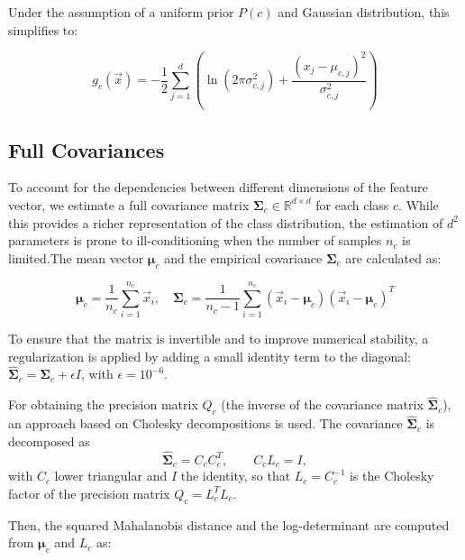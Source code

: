 Under the assumption of a uniform prior $P(c)$ and Gaussian distribution, this simplifies to:

\begin{equation}
	g_c(\vec{x}) = -\frac{1}{2} \sum_{j=1}^{d} \left( \ln(2\pi\sigma_{c,j}^2) + \frac{(x_j - \mu_{c,j})^2}{\sigma_{c,j}^2} \right)
\end{equation}


\subsection{Full Covariances}
\label{sec:method:full_cov}

To account for the dependencies between different dimensions of the feature vector, we estimate a full covariance matrix $\boldsymbol{\Sigma}_c \in \mathbb{R}^{d \times d}$ for each class $c$. While this provides a richer representation of the class distribution, the estimation of $d^2$ parameters is prone to ill-conditioning when the number of samples $n_c$ is limited.The mean vector $\boldsymbol{\mu}_c$ and the empirical covariance $\boldsymbol{\Sigma}_c$ are calculated as:

\begin{equation}
	\boldsymbol{\mu}_c = \frac{1}{n_c} \sum_{i=1}^{n_c} \vec{x}_i, \quad \boldsymbol{\Sigma}_c = \frac{1}{n_c - 1} \sum_{i=1}^{n_c} (\vec{x}_i - \boldsymbol{\mu}_c)(\vec{x}_i - \boldsymbol{\mu}_c)^T
\end{equation}

To ensure that the matrix is invertible and to improve numerical stability, a regularization is applied by adding a small identity term to the diagonal: $\hat{\boldsymbol{\Sigma}}_c = \boldsymbol{\Sigma}_c + \epsilon I$, with $\epsilon = 10^{-6}$.

For obtaining the precision matrix $Q_c$ (the inverse of the covariance matrix $\hat{\boldsymbol{\Sigma}}_c$), an approach based on Cholesky decompositions is used. The covariance $\hat{\boldsymbol{\Sigma}}_c$ is decomposed as
\begin{equation}
	\hat{\boldsymbol{\Sigma}}_c = C_c C_c^T, \qquad C_c L_c = I,
	\label{eq:cholesky_decomp}
\end{equation}
with $C_c$ lower triangular and $I$ the identity, so that $L_c = C_c^{-1}$ is the Cholesky factor of the precision matrix $Q_c = L_c^T L_c$.

Then, the squared Mahalanobis distance and the log-determinant are computed from $\boldsymbol{\mu}_c$ and $L_c$ as:

